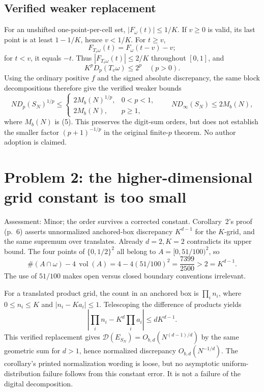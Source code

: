 \documentclass[10pt]{article}
\begin{document}
\subsection*{Verified weaker replacement}
For an unshifted one-point-per-cell set, \(|F_\omega(t)|\le1/K\). If \(v\ge0\) is valid, its last point is at least \(1-1/K\), hence \(v<1/K\). For \(t\ge v\), \[F_{T_v\omega}(t)=F_\omega(t-v)-v;\] for \(t<v\), it equals \(-t\). Thus \(|F_{T_v\omega}(t)|\le2/K\) throughout \([0,1]\), and \[K^pD_p(T_v\omega)\le2^p\quad(p>0).\] Using the ordinary positive \(f\) and the signed absolute discrepancy, the same block decompositions therefore give the verified weaker bounds \[ND_p(S_N)^{1/p}\le
 \begin{cases}
 2M_b(N)^{1/p},&0<p<1,\\
 2M_b(N),&p\ge1,
 \end{cases}
 \qquad ND_\infty(S_N)\le2M_b(N),\] where \(M_b(N)\) is (5). This preserves the digit-sum orders, but does not establish the smaller factor \((p+1)^{-1/p}\) in the original finite-\(p\) theorem. No author adoption is claimed.\par
\section*{Problem 2: the higher-dimensional grid constant is too small}
Assessment: Minor; the order survives a corrected constant. Corollary 2’s proof (p. 6) asserts unnormalized anchored-box discrepancy \(K^{d-1}\) for the \(K\)-grid, and the same supremum over translates. Already \(d=2,K=2\) contradicts its upper bound. The four points of \(\{0,1/2\}^2\) all belong to \(A=[0,51/100)^2\), so \[\#(A\cap\omega)-4\,\operatorname{vol}(A)
 =4-4(51/100)^2=\frac{7399}{2500}>2=K^{d-1}.\] The use of \(51/100\) makes open versus closed boundary conventions irrelevant.\par
For a translated product grid, the count in an anchored box is \(\prod_i n_i\), where \(0\le n_i\le K\) and \(|n_i-Ka_i|\le1\). Telescoping the difference of products yields \[\left|\prod_i n_i-K^d\prod_i a_i\right|\le dK^{d-1}.\] This verified replacement gives \(\mathcal D(E_{S_N})=O_{b,d}(N^{(d-1)/d})\) by the same geometric sum for \(d>1\), hence normalized discrepancy \(O_{b,d}(N^{-1/d})\). The corollary’s printed normalization wording is loose, but no asymptotic uniform-distribution failure follows from this constant error. It is not a failure of the digital decomposition.\par
\end{document}
